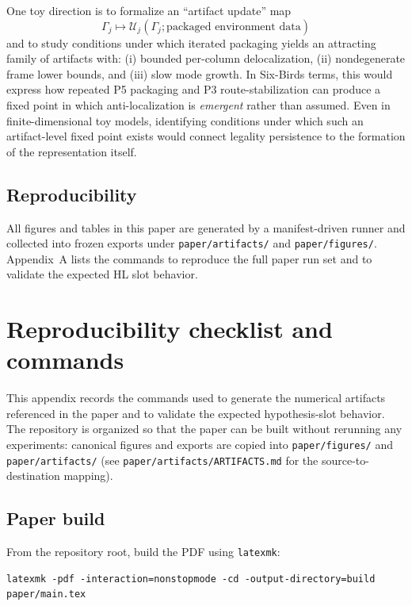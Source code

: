 \documentclass[11pt]{article}
\begin{document}
One toy direction is to formalize an ``artifact update'' map
\[
\Gamma_j \longmapsto \mathcal{U}_j(\Gamma_j; \text{packaged environment data})
\]
and to study conditions under which iterated packaging yields an attracting family of artifacts with:
(i) bounded per-column delocalization, (ii) nondegenerate frame lower bounds, and (iii) slow mode growth.
In Six-Birds terms, this would express how repeated P5 packaging and P3 route-stabilization can produce a fixed point in which anti-localization is \emph{emergent} rather than assumed.
Even in finite-dimensional toy models, identifying conditions under which such an artifact-level fixed point exists would connect legality persistence to the formation of the representation itself.

\subsection{Reproducibility}

All figures and tables in this paper are generated by a manifest-driven runner and collected into frozen exports under \texttt{paper/artifacts/} and \texttt{paper/figures/}.
Appendix~A lists the commands to reproduce the full paper run set and to validate the expected HL slot behavior.
 
\appendix
\appendix
\section{Reproducibility checklist and commands}\label{app:repro}

This appendix records the commands used to generate the numerical artifacts referenced in the paper and to validate the expected hypothesis-slot behavior.
The repository is organized so that the paper can be built without rerunning any experiments: canonical figures and exports are copied into \texttt{paper/figures/} and \texttt{paper/artifacts/} (see \texttt{paper/artifacts/ARTIFACTS.md} for the source-to-destination mapping).

\subsection{Paper build}

From the repository root, build the PDF using \texttt{latexmk}:
\begin{verbatim}
latexmk -pdf -interaction=nonstopmode -cd -output-directory=build paper/main.tex
\end{verbatim}
\end{document}
